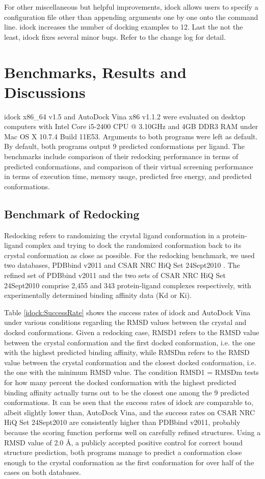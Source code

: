 For other miscellaneous but helpful improvements, idock allows users to specify a configuration file other than appending arguments one by one onto the command line. idock increases the number of docking examples to 12. Last the not the least, idock fixes several minor bugs. Refer to the change log for detail.

\section{Benchmarks, Results and Discussions}

idock x86\_64 v1.5 and AutoDock Vina x86 v1.1.2 were evaluated on desktop computers with Intel Core i5-2400 CPU @ 3.10GHz and 4GB DDR3 RAM under Mac OS X 10.7.4 Build 11E53. Arguments to both programs were left as default. By default, both programs output 9 predicted conformations per ligand. The benchmarks include comparison of their redocking performance in terms of predicted conformations, and comparison of their virtual screening performance in terms of execution time, memory usage, predicted free energy, and predicted conformations.

\subsection{Benchmark of Redocking}

Redocking refers to randomizing the crystal ligand conformation in a protein-ligand complex and trying to dock the randomized conformation back to its crystal conformation as close as possible. For the redocking benchmark, we used two databases, PDBbind v2011 \citep{529,530} and CSAR NRC HiQ Set 24Sept2010 \citep{857,960}. The refined set of PDBbind v2011 and the two sets of CSAR NRC HiQ Set 24Sept2010 comprise 2,455 and 343 protein-ligand complexes respectively, with experimentally determined binding affinity data (Kd or Ki).

Table \ref{idock:SuccessRate} shows the success rates of idock and AutoDock Vina under various conditions regarding the RMSD values between the crystal and docked conformations. Given a redocking case, RMSD1 refers to the RMSD value between the crystal conformation and the first docked conformation, i.e. the one with the highest predicted binding affinity, while RMSDm refers to the RMSD value between the crystal conformation and the closest docked conformation, i.e. the one with the minimum RMSD value. The condition RMSD1 = RMSDm tests for how many percent the docked conformation with the highest predicted binding affinity actually turns out to be the closest one among the 9 predicted conformations. It can be seen that the success rates of idock are comparable to, albeit slightly lower than, AutoDock Vina, and the success rates on CSAR NRC HiQ Set 24Sept2010 are consistently higher than PDBbind v2011, probably because the scoring function performs well on carefully refined structures. Using a RMSD value of 2.0 \AA, a publicly accepted positive control for correct bound structure prediction, both programs manage to predict a conformation close enough to the crystal conformation as the first conformation for over half of the cases on both databases.

